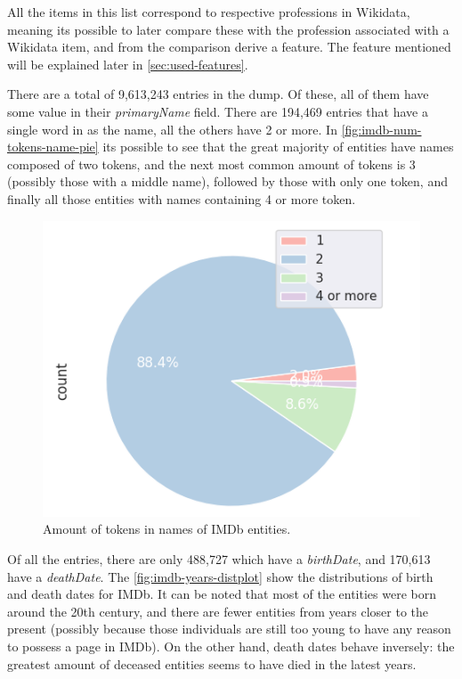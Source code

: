 \documentclass[epsfig,a4paper,11pt,titlepage,twoside,openany]{book}
\begin{document}
All the items in this list correspond to respective professions in Wikidata, meaning its possible to later compare these with the profession associated with a Wikidata item, and from the comparison derive a feature. The feature mentioned will be explained later in \autoref{sec:used-features}.

There are a total of 9,613,243 entries in the dump. Of these, all of them have some value in their \textit{primaryName} field. There are 194,469 entries that have a single word in as the name, all the others have 2 or more. In \autoref{fig:imdb-num-tokens-name-pie} its possible to see that the great majority of entities have names composed of two tokens, and the next most common amount of tokens is 3 (possibly those with a middle name), followed by those with only one token, and finally all those entities with names containing 4 or more token.

\begin{figure}[H]
  \centering \includegraphics[width=.6\textwidth]{imdb_num_tokens_names}
  \caption{Amount of tokens in names of IMDb entities.}
  \label{fig:imdb-num-tokens-name-pie}
\end{figure}


Of all the entries, there are only 488,727 which have a \textit{birthDate}, and 170,613 have a \textit{deathDate}. The  \autoref{fig:imdb-years-distplot} show the distributions of birth and death dates for IMDb. It can be noted that most of the entities were born around the 20th century, and there are fewer entities from years closer to the present (possibly because those individuals are still too young to have any reason to possess a page in IMDb). On the other hand, death dates behave inversely: the greatest amount of deceased entities seems to have died in the latest years.
\end{document}
